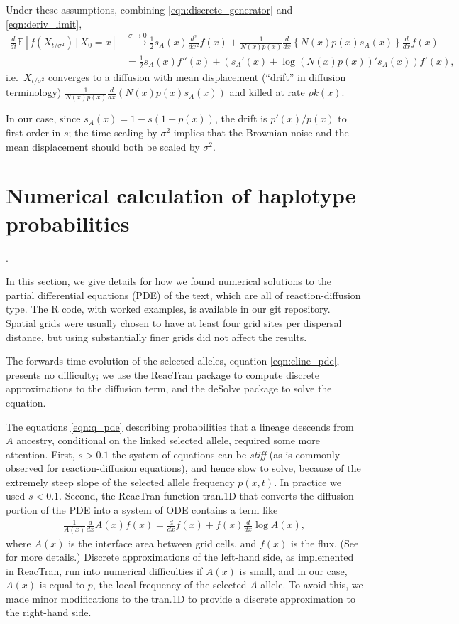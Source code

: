 \documentclass[11pt,letterpaper]{article}
\newcommand{\E}{\mathbb{E}}
\newcommand{\deriv}[1]{\frac{d}{d#1}}
\newcommand{\dderiv}[1]{\frac{d^2}{d#1^2}}
\newcommand{\given}{\,\vert\,}
\begin{document}
Under these assumptions, combining \eqref{eqn:discrete_generator} and \eqref{eqn:deriv_limit},
\begin{align}
    \deriv{t} \E[f(X_{t/\sigma^2}) \given X_0=x ] &\xrightarrow{\sigma \to 0} 
    \frac{1}{2} s_A(x) \dderiv{x} f(x) 
    + \frac{1}{N(x)p(x)} \deriv{x} \left\{ N(x)p(x) s_A(x) \right\}  \deriv{x} f(x) \\
    &= \frac{1}{2} s_A(x) f''(x) + \left( s_A'(x) + \log(N(x)p(x))' s_A(x) \right) f'(x) ,
\end{align}
i.e.\ $X_{t/\sigma^2}$ converges to a diffusion with mean displacement
(``drift'' in diffusion terminology) $\frac{1}{ N(x)p(x)} \deriv{x} ( N(x) p(x) s_A(x) )$ and killed at rate $\rho k(x)$.

In our case, since $s_A(x) = 1 - s (1-p(x))$, the drift is $p'(x)/p(x)$ to first order in $s$;
the time scaling by $\sigma^2$ implies that the Brownian noise and the mean displacement
should both be scaled by $\sigma^2$.


\section{Numerical calculation of haplotype probabilities}
\label{apx:haplotype_calcs}.

In this section, we give details for how we found numerical solutions
to the partial differential equations (PDE) of the text,
which are all of reaction-diffusion type.
The R code, with worked examples, is available in our git repository.
Spatial grids were usually chosen to have at least four grid sites per dispersal distance,
but using substantially finer grids did not affect the results.

The forwards-time evolution of the selected alleles,
equation \eqref{eqn:cline_pde}, presents no difficulty;
we use the ReacTran package \citep{soetaert2012reactive} to compute discrete approximations to the diffusion term,
and the deSolve package \citep{soetaert2010solving} to solve the equation.

The equations \eqref{eqn:q_pde} describing probabilities that a lineage descends from $A$ ancestry,
conditional on the linked selected allele, required some more attention.
First, $s>0.1$ the system of equations can be \emph{stiff} 
(as is commonly observed for reaction-diffusion equations),
and hence slow to solve,
because of the extremely steep slope of the selected allele frequency $p(x,t)$.
In practice we used $s<0.1$.
Second, the ReacTran function tran.1D that converts the diffusion portion of the PDE into a system of ODE
contains a term like 
\begin{align*}
    \frac{1}{A(x)} \frac{d}{dx} A(x) f(x) = \frac{d}{dx} f(x) + f(x) \frac{d}{dx} \log A(x) ,
\end{align*}
where $A(x)$ is the interface area between grid cells, and $f(x)$ is the flux.
(See \citet{soetaert2012reactive} for more details.)
Discrete approximations of the left-hand side, as implemented in ReacTran, 
run into numerical difficulties if $A(x)$ is small,
and in our case, $A(x)$ is equal to $p$, the local frequency of the selected $A$ allele.
To avoid this, we made minor modifications to the tran.1D to provide a discrete approximation to the right-hand side.
\end{document}
